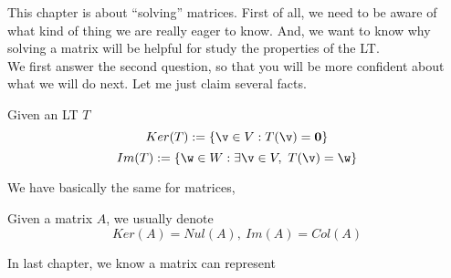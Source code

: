 

This chapter is about ``solving'' matrices. First of all, we need to be aware of what kind of thing we are really eager to know. And, we want to know why solving a matrix will be helpful for study the properties of the LT. \\

We first answer the second question, so that you will be more confident about what we will do next. Let me just claim several facts. 

\begin{definition}
    Given an LT $T$\\
    $$Ker(T) := \{\v \in V: T(\v)= \mathbf{0}\}$$
    $$Im(T):= \{\w \in W: \exists \v \in V, \ T(\v) = \w\}$$
\end{definition}
We have basically the same for matrices,
\begin{definition}
    Given a matrix $A$, we usually denote 
    $$Ker(A) = Nul(A),\ Im(A) = Col(A)$$
\end{definition}

In last chapter, we know a matrix can represent 